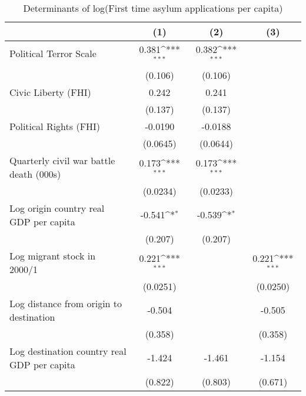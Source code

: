 \begin{table}[htbp]\centering
\def\sym#1{\ifmmode^{#1}\else\(^{#1}\)\fi}
\caption{Determinants of log(First time asylum applications per capita)}
\begin{tabular}{l*{3}{c}}
\hline\hline
                    &\multicolumn{1}{c}{(1)}         &\multicolumn{1}{c}{(2)}         &\multicolumn{1}{c}{(3)}         \\
\hline
Political Terror Scale&       0.381\sym{***}&       0.382\sym{***}&                     \\
                    &     (0.106)         &     (0.106)         &                     \\
[1em]
Civic Liberty (FHI) &       0.242         &       0.241         &                     \\
                    &     (0.137)         &     (0.137)         &                     \\
[1em]
Political Rights (FHI)&     -0.0190         &     -0.0188         &                     \\
                    &    (0.0645)         &    (0.0644)         &                     \\
[1em]
Quarterly civil war battle death (000s)&       0.173\sym{***}&       0.173\sym{***}&                     \\
                    &    (0.0234)         &    (0.0233)         &                     \\
[1em]
Log origin country real GDP per capita&      -0.541\sym{*}  &      -0.539\sym{*}  &                     \\
                    &     (0.207)         &     (0.207)         &                     \\
[1em]
Log migrant stock in 2000/1&       0.221\sym{***}&                     &       0.221\sym{***}\\
                    &    (0.0251)         &                     &    (0.0250)         \\
[1em]
Log distance from origin to destination&      -0.504         &                     &      -0.505         \\
                    &     (0.358)         &                     &     (0.358)         \\
[1em]
Log destination country real GDP per capita&      -1.424         &      -1.461         &      -1.154         \\
                    &     (0.822)         &     (0.803)         &     (0.671)         \\

\end{tabular}
\end{table}
